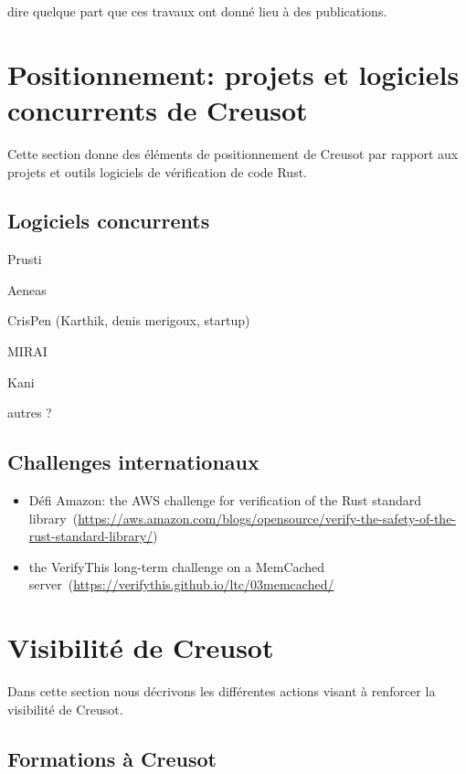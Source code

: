 \documentclass[a4paper,11pt]{article}
\begin{document}
dire quelque part que ces travaux ont donné lieu à des publications.

\section{Positionnement: projets et logiciels concurrents de Creusot}

Cette section donne des éléments de positionnement de Creusot par rapport aux projets et outils logiciels de vérification de code Rust.

\subsection{Logiciels concurrents}

Prusti

Aeneas

CrisPen (Karthik, denis merigoux, startup)

MIRAI

Kani

autres ?

\subsection{Challenges internationaux}
\label{sec:challenges}

\begin{itemize}
\item Défi Amazon: the AWS challenge for verification of the Rust standard
  library~(\url{https://aws.amazon.com/blogs/opensource/verify-the-safety-of-the-rust-standard-library/})

\item the VerifyThis long-term challenge on a MemCached
  server~(\url{https://verifythis.github.io/ltc/03memcached/}

\end{itemize}




\section{Visibilité de Creusot}

Dans cette section nous décrivons les différentes actions visant à renforcer la visibilité de Creusot.

\subsection{Formations à Creusot}
\end{document}
